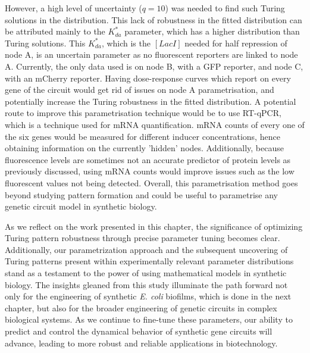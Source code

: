 However, a high level of uncertainty ($q=10$) was needed to find such Turing solutions in the distribution.
This lack of robustness in the fitted distribution can be attributed mainly to the $K^*_{da}$ parameter, which has a higher distribution than Turing solutions.
This $K^*_{da}$, which is the $[LacI]$ needed for half repression of node A, is an uncertain parameter as no fluorescent reporters are linked to node A.
Currently, the only data used is on node B, with a GFP reporter, and node
C, with an mCherry reporter.
Having dose-response curves which report on every gene of the circuit would get rid of issues on node A parametrisation, and potentially increase the Turing robustness in the fitted distribution.
A potential route to improve this parametrisation technique would be to use RT-qPCR, which is a technique used for mRNA quantification.
mRNA counts of every one of the six genes would be measured for different inducer concentrations, hence obtaining information on the currently 'hidden' nodes.
Additionally, because fluorescence levels are sometimes not an accurate predictor of protein levels as previously discussed, using mRNA counts would improve issues such as the low fluorescent values not being detected.
Overall, this parametrisation method goes beyond studying pattern formation and could be useful to parametrise any genetic circuit model in synthetic biology.


As we reflect on the work presented in this chapter, the significance of optimizing Turing pattern robustness through precise parameter tuning becomes clear.
Additionally, our parametrization approach and the subsequent uncovering of Turing patterns present within experimentally relevant parameter distributions stand as a testament to the power of using mathematical models in synthetic biology.
The insights gleaned from this study illuminate the path forward not only for the engineering of synthetic \textit{E. coli} biofilms, which is done in the next chapter, but also for the broader engineering of genetic circuits in complex biological systems.
As we continue to fine-tune these parameters, our ability to predict and control the dynamical behavior of synthetic gene circuits will advance, leading to more robust and reliable applications in biotechnology.

